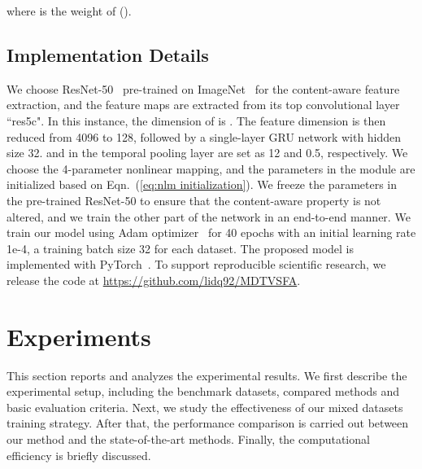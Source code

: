 \documentclass[twocolumn]{svjour3}          \smartqed  \usepackage{graphicx}
\begin{document}
where  is the weight of  ().

\subsection{Implementation Details}
We choose ResNet-50~\citep{he2016deep} pre-trained on ImageNet~\citep{deng2009imagenet} for the content-aware feature extraction, and the feature maps are extracted from its top convolutional layer ``res5c". 
In this instance, the dimension of  is .
The feature dimension is then reduced from 4096 to 128, followed by a single-layer GRU network with hidden size 32. 
 and  in the temporal pooling layer are set as 12 and 0.5, respectively. 
We choose the 4-parameter nonlinear mapping, and the parameters in the module are initialized based on Eqn.~(\ref{eq:nlm initialization}).
We freeze the parameters in the pre-trained ResNet-50 to ensure that the content-aware property is not altered, and we train the other part of the network in an end-to-end manner. 
We train our model using Adam optimizer~\citep{kingma2014adam} for 40 epochs with an initial learning rate 1e-4, a training batch size 32 for each dataset.
The proposed model is implemented with PyTorch~\citep{paszke2019pytorch}.
To support reproducible scientific research, we release the code at \url{https://github.com/lidq92/MDTVSFA}.

\section{Experiments}
\label{sec:experiments}
This section reports and analyzes the experimental results. 
We first describe the experimental setup, including the benchmark datasets, compared methods and basic evaluation criteria. 
Next, we study the effectiveness of our mixed datasets training strategy. 
After that, the performance comparison is carried out between our method and the state-of-the-art methods. 
Finally, the computational efficiency is briefly discussed.
\end{document}

